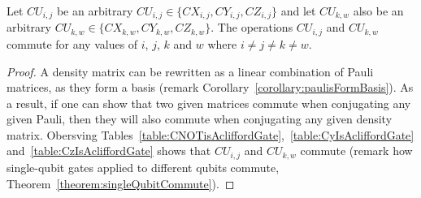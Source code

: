 \begin{theorem}
\label{theorem:CUsCommuteDifferentIndices}
Let $\mathit{CU}_{i,j}$ be an arbitrary $\mathit{CU}_{i,j} \in \{\mathit{CX}_{i,j}, \mathit{CY}_{i,j}, \mathit{CZ}_{i,j}\}$ and let $\mathit{CU}_{k,w}$ also be an arbitrary $\mathit{CU}_{k,w} \in \{\mathit{CX}_{k,w}, \mathit{CY}_{k,w}, \mathit{CZ}_{k,w}\}$. The operations $\mathit{CU}_{i,j}$ and $\mathit{CU}_{k,w}$ commute for any values of $i$, $j$, $k$ and $w$ where $i \neq j \neq k \neq w$.
\end{theorem}
\begin{proof}
A density matrix can be rewritten as a linear combination of Pauli matrices, as they form a basis (remark Corollary~\ref{corollary:paulisFormBasis}). As a result, if one can show that two given matrices commute when conjugating any given Pauli, then they will also commute when conjugating any given density matrix. Obersving  Tables~\ref{table:CNOTisAcliffordGate},~\ref{table:CyIsAcliffordGate} and~\ref{table:CzIsAcliffordGate} shows that $\mathit{CU}_{i,j}$ and $\mathit{CU}_{k,w}$ commute (remark how single-qubit gates applied to different qubits commute, Theorem~\ref{theorem:singleQubitCommute}).
\end{proof}

